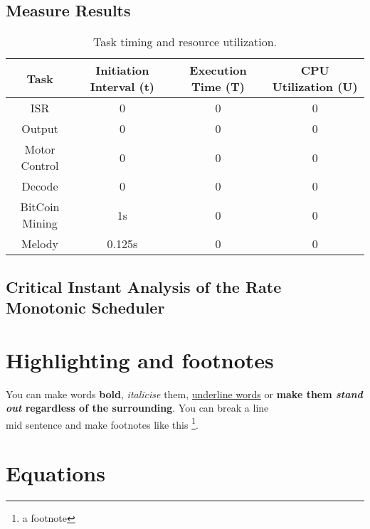 \documentclass{article}
\begin{document}
\subsection{Measure Results}
\begin{table}[ht]
\centering                      %
\begin{tabular}{c c c c}        %
Task & Initiation Interval (t) & Execution Time (T) & CPU Utilization (U) \\ [0.5ex]   %
\hline                          %
ISR & 0 & 0 & 0 \\           %
Output & 0 & 0 & 0 \\                         
Motor Control & 0 & 0  & 0 \\
Decode & 0 & 0 & 0 \\
BitCoin Mining & 1s & 0 & 0 \\
Melody & 0.125s & 0 & 0\\[1ex]     %
\end{tabular}
\caption{Task timing and resource utilization.} 
\label{table:nonlin}            %
\end{table}


\subsection{Critical Instant Analysis of the Rate Monotonic Scheduler}









\section{Highlighting and footnotes}
You can make words \textbf{bold}, \textit{italicise} them, \underline{underline words} or \textbf{make them \emph{stand out} regardless of the surrounding}. You can break a line\\ mid sentence and make footnotes like this \footnote{a footnote}.

\section{Equations}

\end{document}
